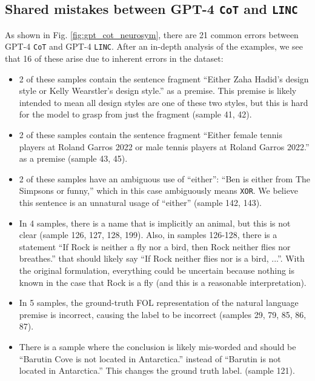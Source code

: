 \subsection{Shared mistakes between GPT-4 \texttt{CoT} and \texttt{LINC}} \label{sec:appendix_sharedmistakes}
As shown in Fig. \ref{fig:gpt_cot_neurosym}, there are 21 common errors between GPT-4 \texttt{CoT} and GPT-4 \texttt{LINC}. After an in-depth analysis of the examples, we see that 16 of these arise due to inherent errors in the dataset:
\begin{itemize}
\item 2 of these samples contain the sentence fragment ``Either Zaha Hadid's design style or Kelly Wearstler's design style.'' as a premise. This premise is likely intended to mean all design styles are one of these two styles, but this is hard for the model to grasp from just the fragment (sample 41, 42).
\item 2 of these samples contain the sentence fragment ``Either female tennis players at Roland Garros 2022 or male tennis players at Roland Garros 2022.'' as a premise (sample 43, 45).
\item 2 of these samples have an ambiguous use of ``either'': ``Ben is either from The Simpsons or funny,'' which in this case ambiguously means \texttt{XOR}. We believe this sentence is an unnatural usage of ``either'' (sample 142, 143).
\item In 4 samples, there is a name that is implicitly an animal, but this is not clear (sample 126, 127, 128, 199). Also, in samples 126-128, there is a statement ``If Rock is neither a fly nor a bird, then Rock neither flies nor breathes.'' that should likely say ``If Rock neither flies nor is a bird, ...''. With the original formulation, everything could be uncertain because nothing is known in the case that Rock is a fly (and this is a reasonable interpretation).
\item In 5 samples, the ground-truth FOL representation of the natural language premise is incorrect, causing the label to be incorrect (samples 29, 79, 85, 86, 87).
\item There is a sample where the conclusion is likely mis-worded and should be ``Barutin Cove is not located in Antarctica.'' instead of ``Barutin is not located in Antarctica.'' This changes the ground truth label. (sample 121).
\end{itemize}

